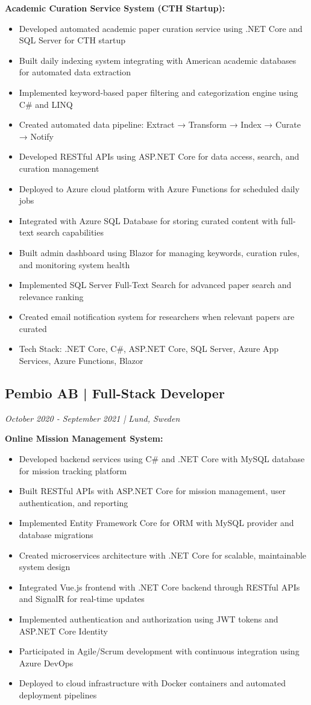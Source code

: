 \documentclass[11pt,a4paper]{article}
\begin{document}
\textbf{Academic Curation Service System (CTH Startup):}
\begin{itemize}[leftmargin=*, itemsep=2pt]
\item Developed automated academic paper curation service using .NET Core and SQL Server for CTH startup
\item Built daily indexing system integrating with American academic databases for automated data extraction
\item Implemented keyword-based paper filtering and categorization engine using C\# and LINQ
\item Created automated data pipeline: Extract → Transform → Index → Curate → Notify
\item Developed RESTful APIs using ASP.NET Core for data access, search, and curation management
\item Deployed to Azure cloud platform with Azure Functions for scheduled daily jobs
\item Integrated with Azure SQL Database for storing curated content with full-text search capabilities
\item Built admin dashboard using Blazor for managing keywords, curation rules, and monitoring system health
\item Implemented SQL Server Full-Text Search for advanced paper search and relevance ranking
\item Created email notification system for researchers when relevant papers are curated
\item Tech Stack: .NET Core, C\#, ASP.NET Core, SQL Server, Azure App Services, Azure Functions, Blazor
\end{itemize}

\subsection*{Pembio AB | Full-Stack Developer}
\textit{October 2020 - September 2021 | Lund, Sweden}

\textbf{Online Mission Management System:}
\begin{itemize}[leftmargin=*, itemsep=2pt]
\item Developed backend services using C\# and .NET Core with MySQL database for mission tracking platform
\item Built RESTful APIs with ASP.NET Core for mission management, user authentication, and reporting
\item Implemented Entity Framework Core for ORM with MySQL provider and database migrations
\item Created microservices architecture with .NET Core for scalable, maintainable system design
\item Integrated Vue.js frontend with .NET Core backend through RESTful APIs and SignalR for real-time updates
\item Implemented authentication and authorization using JWT tokens and ASP.NET Core Identity
\item Participated in Agile/Scrum development with continuous integration using Azure DevOps
\item Deployed to cloud infrastructure with Docker containers and automated deployment pipelines
\end{itemize}
\end{document}
